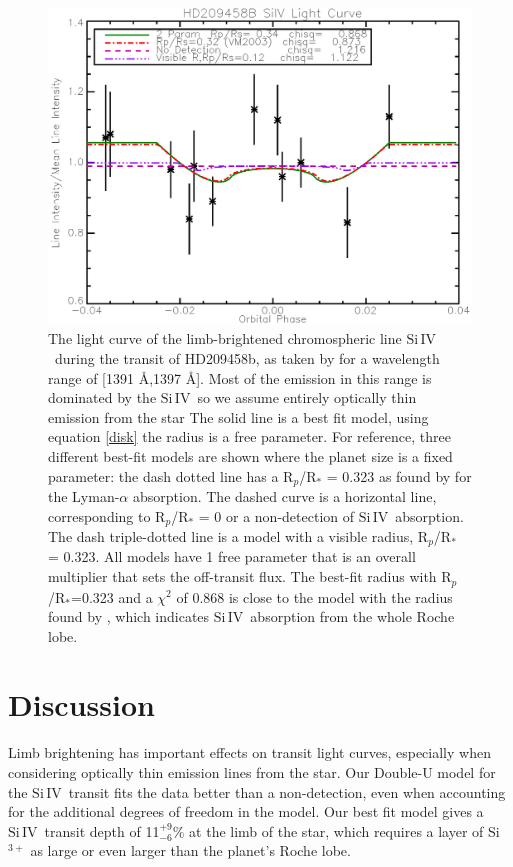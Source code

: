 \documentclass[manuscript]{aastex}
\newcommand{\siIV}{\ensuremath{\mathrm{Si}\,\scriptstyle \mathrm{IV}}}
\begin{document}
\begin{figure}[!ht]
\begin{center}
\includegraphics[width=0.5 \textwidth]{hd209458.eps}
\caption{The light curve of the limb-brightened chromospheric line \siIV\ during the transit of HD209458b, as taken by \citet{vidmad} for a wavelength range of [1391 \AA,1397 \AA]. Most of the emission in this range is dominated by the \siIV\, so we assume entirely optically thin emission from the star The solid line is a best fit model, using equation \ref{disk}  the radius is a free parameter. For reference, three different best-fit models are shown where the planet size is a fixed parameter: the dash dotted line has a R$_p$/R$_*$ = 0.323 as found by \citet{vidmad} for the Lyman-$\alpha$ absorption. The dashed curve is a horizontal line, corresponding to R$_p$/R$_*$ = 0 or a non-detection of \siIV\ absorption. The dash triple-dotted line is a model with a visible radius, R$_p$/R$_*$ = 0.323. All models have 1 free parameter that is an overall multiplier that sets the off-transit flux. The best-fit radius with R$_p$/R$_*$=0.323 and a $\chi^2$ of 0.868 is close to the model with the radius found by \citet{vidmad}, which indicates \siIV\ absorption from the whole Roche lobe. }
\end{center}
\label{lightc}
\end{figure}

\section{Discussion} \label{discuss}

Limb brightening has important effects on transit light curves, especially when considering optically thin emission lines from the star. Our Double-U model for the \siIV\ transit fits the data better than a non-detection, even when accounting for the additional degrees of freedom in the model. Our best fit model gives a \siIV\ transit depth of 11$^{+9}_{-6}$\% at the limb  of the star, which requires a layer of Si$^{3+}$ as large or even larger than the planet's Roche lobe.
\end{document}
